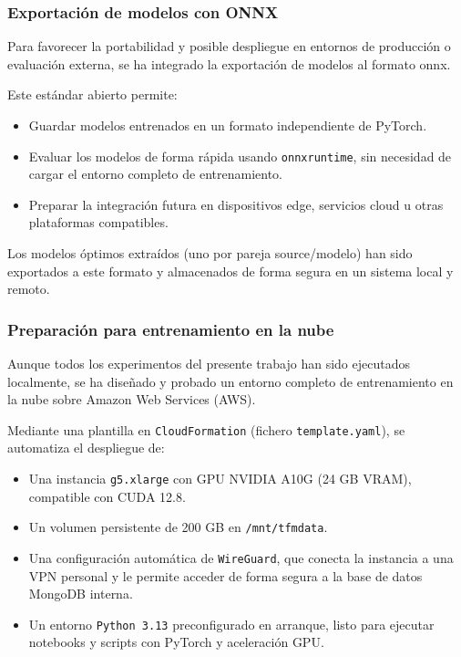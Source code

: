 \subsubsection*{Exportación de modelos con ONNX}

Para favorecer la portabilidad y posible despliegue en entornos de producción o evaluación externa, se ha integrado la exportación de modelos al formato \gls{onnx}.

Este estándar abierto permite:
\begin{itemize}
	\item Guardar modelos entrenados en un formato independiente de PyTorch.
	\item Evaluar los modelos de forma rápida usando \texttt{onnxruntime}, sin necesidad de cargar el entorno completo de entrenamiento.
	\item Preparar la integración futura en dispositivos edge, servicios cloud u otras plataformas compatibles.
\end{itemize}

Los modelos óptimos extraídos (uno por pareja source/modelo) han sido exportados a este formato y almacenados de forma segura en un sistema local y remoto.

\subsubsection*{Preparación para entrenamiento en la nube}

Aunque todos los experimentos del presente trabajo han sido ejecutados localmente, se ha diseñado y probado un entorno completo de entrenamiento en la nube sobre Amazon Web Services (AWS).

Mediante una plantilla en \texttt{CloudFormation} (fichero \texttt{template.yaml}), se automatiza el despliegue de:

\begin{itemize}
	\item Una instancia \texttt{g5.xlarge} con GPU NVIDIA A10G (24 GB VRAM), compatible con CUDA 12.8.
	\item Un volumen persistente de 200 GB en \texttt{/mnt/tfmdata}.
	\item Una configuración automática de \texttt{WireGuard}, que conecta la instancia a una VPN personal y le permite acceder de forma segura a la base de datos MongoDB interna.
	\item Un entorno \texttt{Python 3.13} preconfigurado en arranque, listo para ejecutar notebooks y scripts con PyTorch y aceleración GPU.
\end{itemize}

